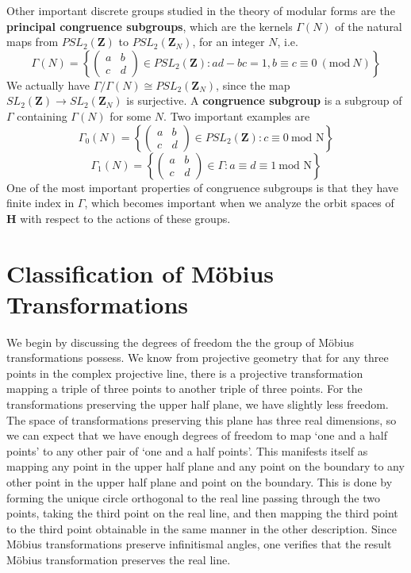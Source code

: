Other important discrete groups studied in the theory of modular forms are the {\bf principal congruence subgroups}, which are the kernels $\Gamma(N)$ of the natural maps from $PSL_2(\mathbf{Z})$ to $PSL_2(\mathbf{Z}_N)$, for an integer $N$, i.e.
%
\[ \Gamma(N) = \left\{ \begin{pmatrix} a & b \\ c & d \end{pmatrix} \in PSL_2(\mathbf{Z}) : ad - bc = 1, b \equiv c \equiv 0\ (\text{mod}\ N) \right\} \]
%
We actually have $\Gamma/\Gamma(N) \cong PSL_2(\mathbf{Z}_N)$, since the map $SL_2(\mathbf{Z}) \to SL_2(\mathbf{Z}_N)$ is surjective. A {\bf congruence subgroup} is a subgroup of $\Gamma$ containing $\Gamma(N)$ for some $N$. Two important examples are
%
\[ \Gamma_0(N) = \left\{ \begin{pmatrix} a & b \\ c & d \end{pmatrix} \in PSL_2(\mathbf{Z}): c \equiv 0\ \text{mod N} \right\} \]
\[ \Gamma_1(N) = \left\{ \begin{pmatrix} a & b \\ c & d \end{pmatrix} \in \Gamma : a \equiv d \equiv 1\ \text{mod N} \right\} \]
%
One of the most important properties of congruence subgroups is that they have finite index in $\Gamma$, which becomes important when we analyze the orbit spaces of $\mathbf{H}$ with respect to the actions of these groups.

\section{Classification of M\"{o}bius Transformations}

We begin by discussing the degrees of freedom the the group of M\"{o}bius transformations possess. We know from projective geometry that for any three points in the complex projective line, there is a projective transformation mapping a triple of three points to another triple of three points. For the transformations preserving the upper half plane, we have slightly less freedom. The space of transformations preserving this plane has three real dimensions, so we can expect that we have enough degrees of freedom to map `one and a half points' to any other pair of `one and a half points'. This manifests itself as mapping any point in the upper half plane and any point on the boundary to any other point in the upper half plane and point on the boundary. This is done by forming the unique circle orthogonal to the real line passing through the two points, taking the third point on the real line, and then mapping the third point to the third point obtainable in the same manner in the other description. Since M\"{o}bius transformations preserve infinitismal angles, one verifies that the result M\"{o}bius transformation preserves the real line.

